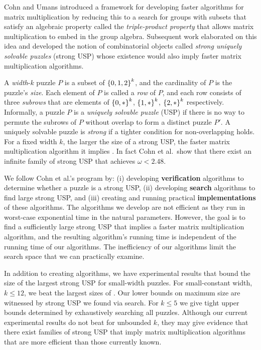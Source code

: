 \documentclass[11pt]{article}
\begin{document}

Cohn and Umans \cite{cu03} introduced a framework for developing
faster algorithms for matrix multiplication by reducing this 
to a search for groups with subsets that satisfy an algebraic
property called the \emph{triple-product property} that allows matrix
multiplication to embed in the group algebra.  Subsequent work
\cite{cksu05} elaborated on this idea and developed the notion of
combinatorial objects called \emph{strong uniquely solvable puzzles}
(strong USP) whose existence would also imply faster matrix multiplication
algorithms.

A \emph{width}-$k$ puzzle $P$ is a subset of $\left\{ 0,1,2 \right\}^k$,
and the cardinality of $P$ is the puzzle's \emph{size}.  Each element
of $P$ is called a \emph{row} of $P$, and each row consists of three
\emph{subrows} that are elements of $\left\{ 0,* \right\}^k$, $\left\{ 1,* \right\}^k$,
$\left\{ 2,* \right\}^k$ respectively.  Informally, a puzzle $P$ is a
\emph{uniquely solvable puzzle} (USP) if there is no way to permute
the subrows of $P$ without overlap to form a distinct puzzle $P'$.  A
uniquely solvable puzzle is \emph{strong} if a tighter condition for
non-overlapping holds. For a fixed
width $k$, the larger the size of a strong USP, the faster matrix
multiplication algorithm it implies \cite{cksu05}.  In fact Cohn et
al.~show that there exist an infinite family of strong USP that achieves
$\omega < 2.48$.


We follow Cohn et al.'s program by: (i) developing \textbf{verification}
algorithms to determine whether a puzzle is a strong USP, (ii) developing
\textbf{search} algorithms to find large strong USP, and (iii) creating and
running practical \textbf{implementations} of these algorithms.  The
algorithms we develop are not efficient as they run in worst-case exponential
time in the natural parameters.  However, the goal is to find a
sufficiently large strong USP that implies a faster matrix
multiplication algorithm, and the resulting algorithm's running time
is independent of the running time of our algorithms.  The
inefficiency of our algorithms limit the search space that
we can practically examine.


In addition to creating algorithms, we have experimental results that
bound the size of the largest strong USP for small-width puzzles.  For
small-constant width, $k \le 12$, we beat the largest sizes of
\cite[Proposition 3.8]{cksu05}.  Our lower bounds on maximum size are
witnessed by strong USP we found via search.  For $k \le 5$ we give tight
upper bounds determined by exhaustively searching all puzzles.
Although our current experimental results do not beat \cite{cksu05}
for unbounded $k$, they may give evidence that there exist families of
strong USP that imply matrix multiplication algorithms that are more
efficient than those currently known.
\end{document}
